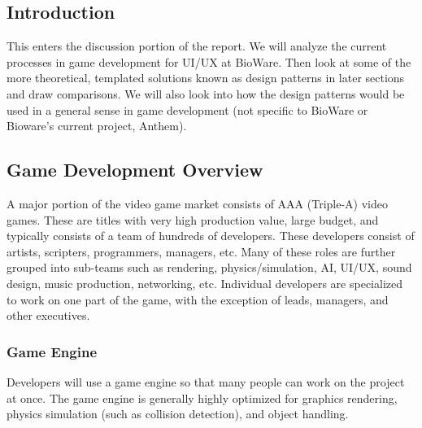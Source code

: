 \documentclass[10pt,letterpaper]{article}
\begin{document}
\begin{multicols}{2}

\section{Introduction}

This enters the discussion portion of the report. We will analyze the current processes in game development for UI/UX at BioWare. Then look at some of the more theoretical, templated solutions known as design patterns in later sections and draw comparisons. We will also look into how the design patterns would be used in a general sense in game development (not specific to BioWare or Bioware's current project, Anthem).

\subsection{Game Development Overview}



A major portion of the video game market consists of AAA (Triple-A) video games. These are titles with very high production value, large budget, and typically consists of a team of hundreds of developers. These developers consist of artists, scripters, programmers, managers, etc. Many of these roles are further grouped into sub-teams such as rendering, physics/simulation, AI, UI/UX, sound design, music production, networking, etc. Individual developers are specialized to work on one part of the game, with the exception of leads, managers, and other executives.

\subsubsection{Game Engine}
Developers will use a game engine so that many people can work on the project at once. The game engine is generally highly optimized for graphics rendering, physics simulation (such as collision detection), and object handling.\\


\end{multicols}
\end{document}
